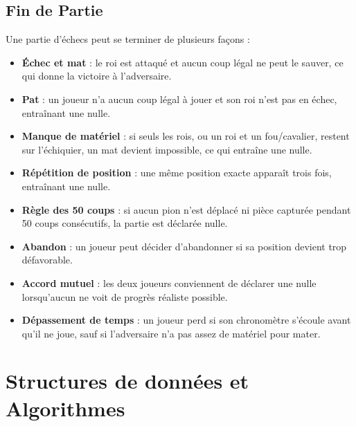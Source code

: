 \documentclass{article}
\begin{document}
\subsection{Fin de Partie}
Une partie d'échecs peut se terminer de plusieurs façons :
\begin{itemize}
    \item \textbf{Échec et mat} : le roi est attaqué et aucun coup légal ne peut le sauver, ce qui donne la victoire à l'adversaire.
    \item \textbf{Pat} : un joueur n'a aucun coup légal à jouer et son roi n'est pas en échec, entraînant une nulle.
    \item \textbf{Manque de matériel} : si seuls les rois, ou un roi et un fou/cavalier, restent sur l'échiquier, un mat devient impossible, ce qui entraîne une nulle.
    \item \textbf{Répétition de position} : une même position exacte apparaît trois fois, entraînant une nulle.
    \item \textbf{Règle des 50 coups} : si aucun pion n'est déplacé ni pièce capturée pendant 50 coups consécutifs, la partie est déclarée nulle.
    \item \textbf{Abandon} : un joueur peut décider d'abandonner si sa position devient trop défavorable.
    \item \textbf{Accord mutuel} : les deux joueurs conviennent de déclarer une nulle lorsqu'aucun ne voit de progrès réaliste possible.
    \item \textbf{Dépassement de temps} : un joueur perd si son chronomètre s'écoule avant qu'il ne joue, sauf si l'adversaire n'a pas assez de matériel pour mater.
\end{itemize}



\section{Structures de données et Algorithmes}
\label{DataStruct}
\end{document}
